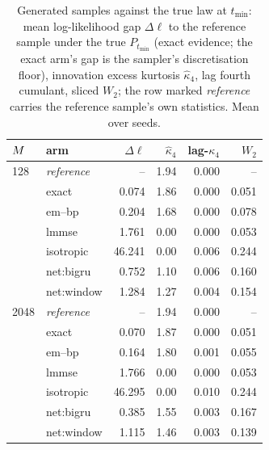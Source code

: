 \begin{table}[t]\centering\small\setlength{\tabcolsep}{4pt}
\caption{Generated samples against the true law at $t_{\min}$: mean log-likelihood gap $\Delta\ell$ to the reference sample under the true $P_{t_{\min}}$ (exact evidence; the exact arm's gap is the sampler's discretisation floor), innovation excess kurtosis $\hat\kappa_4$, lag fourth cumulant, sliced $W_2$; the row marked \emph{reference} carries the reference sample's own statistics. Mean over seeds.}
\label{tab:generation}
\begin{tabular}{@{}llrrrr@{}}
\toprule
$M$ & arm & $\Delta\ell$ & $\hat\kappa_4$ & lag-$\kappa_4$ & $W_2$ \\
\midrule
128 & \emph{reference} & -- & 1.94 & 0.000 & -- \\
 & exact & 0.074 & 1.86 & 0.000 & 0.051 \\
 & em--bp & 0.204 & 1.68 & 0.000 & 0.078 \\
 & lmmse & 1.761 & 0.00 & 0.000 & 0.053 \\
 & isotropic & 46.241 & 0.00 & 0.006 & 0.244 \\
 & net:bigru & 0.752 & 1.10 & 0.006 & 0.160 \\
 & net:window & 1.284 & 1.27 & 0.004 & 0.154 \\
\midrule
2048 & \emph{reference} & -- & 1.94 & 0.000 & -- \\
 & exact & 0.070 & 1.87 & 0.000 & 0.051 \\
 & em--bp & 0.164 & 1.80 & 0.001 & 0.055 \\
 & lmmse & 1.766 & 0.00 & 0.000 & 0.053 \\
 & isotropic & 46.295 & 0.00 & 0.010 & 0.244 \\
 & net:bigru & 0.385 & 1.55 & 0.003 & 0.167 \\
 & net:window & 1.115 & 1.46 & 0.003 & 0.139 \\
\bottomrule
\end{tabular}
\end{table}
